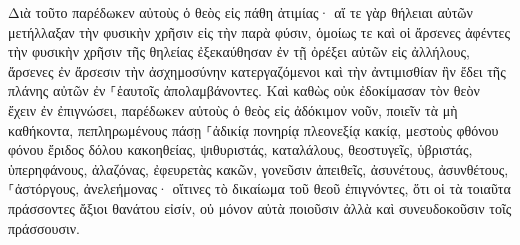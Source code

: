 \documentclass[twoside, 9pt]{extreport}
\begin{document}
Διὰ τοῦτο παρέδωκεν αὐτοὺς ὁ θεὸς εἰς πάθη ἀτιμίας· αἵ τε γὰρ θήλειαι αὐτῶν μετήλλαξαν τὴν φυσικὴν χρῆσιν εἰς τὴν παρὰ φύσιν, 
ὁμοίως τε καὶ οἱ ἄρσενες ἀφέντες τὴν φυσικὴν χρῆσιν τῆς θηλείας ἐξεκαύθησαν ἐν τῇ ὀρέξει αὐτῶν εἰς ἀλλήλους, ἄρσενες ἐν ἄρσεσιν τὴν ἀσχημοσύνην κατεργαζόμενοι καὶ τὴν ἀντιμισθίαν ἣν ἔδει τῆς πλάνης αὐτῶν ἐν ⸀ἑαυτοῖς ἀπολαμβάνοντες. 
Καὶ καθὼς οὐκ ἐδοκίμασαν τὸν θεὸν ἔχειν ἐν ἐπιγνώσει, παρέδωκεν αὐτοὺς ὁ θεὸς εἰς ἀδόκιμον νοῦν, ποιεῖν τὰ μὴ καθήκοντα, 
πεπληρωμένους πάσῃ ⸀ἀδικίᾳ πονηρίᾳ πλεονεξίᾳ κακίᾳ, μεστοὺς φθόνου φόνου ἔριδος δόλου κακοηθείας, ψιθυριστάς, 
καταλάλους, θεοστυγεῖς, ὑβριστάς, ὑπερηφάνους, ἀλαζόνας, ἐφευρετὰς κακῶν, γονεῦσιν ἀπειθεῖς, 
ἀσυνέτους, ἀσυνθέτους, ⸀ἀστόργους, ἀνελεήμονας· 
οἵτινες τὸ δικαίωμα τοῦ θεοῦ ἐπιγνόντες, ὅτι οἱ τὰ τοιαῦτα πράσσοντες ἄξιοι θανάτου εἰσίν, οὐ μόνον αὐτὰ ποιοῦσιν ἀλλὰ καὶ συνευδοκοῦσιν τοῖς πράσσουσιν. 
\end{document}
